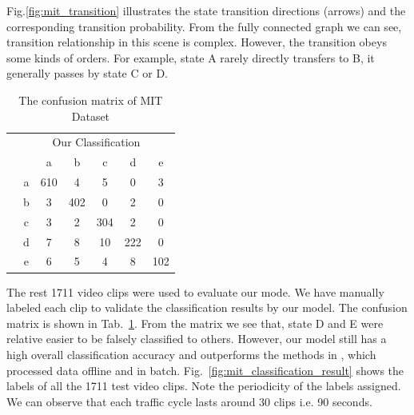Fig.\ref{fig:mit_transition} illustrates the state transition directions (arrows) and the corresponding transition probability. From the fully connected graph we can see, transition relationship in this scene is complex. However, the transition  obeys some kinds of orders. For example, state A rarely directly transfers to B, it generally passes by state C or D.

\begin{table}[!htbp]
	\begin{center}
		\renewcommand\arraystretch{2}
		\setlength{\tabcolsep}{8pt}
		\begin{tabular}{c c|c|c|c|c|c|}
			\multicolumn{1}{c}{ }	& \multicolumn{6}{c}{Our Classification }\\
			\multirow{6}{5pt}{\rotatebox{90}{Manually label}}		&\multicolumn{1}{c}{ }	&\multicolumn{1}{c}{a}	&\multicolumn{1}{c}{b}	&\multicolumn{1}{c}{c}	&\multicolumn{1}{c}{d}	&\multicolumn{1}{c}{e}\\
			\cline{3-7}
			&a		&610	&4	&5	&0	&3\\
			\cline{3-7}
			&b	&3	&402	&0	&2	&0\\
			\cline{3-7}
			&c		&3	&2	&304	&2	&0\\
			\cline{3-7}
			&d		&7	&8	&10	&222	&0\\
			\cline{3-7}
			&e	&6	&5	&4	&8	&102\\
			\cline{3-7}
		\end{tabular}
	\end{center}
	\caption[The confusion matrix of MIT Dataset]
	{The confusion matrix of MIT Dataset}
	\label{tab:mit_confuse} 
\end{table}
The rest 1711 video clips were used to evaluate our mode. We have manually labeled each clip to validate the classification results by our model. The confusion matrix is shown in Tab.~\ref{tab:mit_confuse}. 
From the matrix we see that, state D and E were relative easier to be falsely classified to others. However, our model still has a high overall classification accuracy and outperforms the methods in \cite{wang2009unsupervised}, which processed data offline and in batch.
Fig.~\ref{fig:mit_classification_result} shows the labels of all the 1711 test video clips. Note the periodicity of the labels assigned. We can observe that each traffic cycle lasts around 30 clips i.e. 90 seconds.


